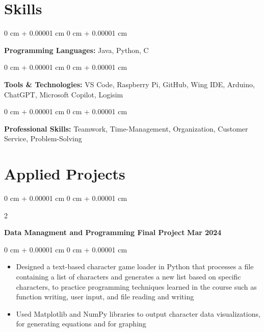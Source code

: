 \documentclass[10pt, letterpaper]{article}
\newenvironment{highlights}{
    \begin{itemize}[
        topsep=0.10 cm,
        parsep=0.10 cm,
        partopsep=0pt,
        itemsep=0pt,
        leftmargin=0 cm + 10pt
    ]
}{
    \end{itemize}
} %
\newenvironment{onecolentry}{
    \begin{adjustwidth}{
        0 cm + 0.00001 cm
    }{
        0 cm + 0.00001 cm
    }
}{
    \end{adjustwidth}
} %
\newenvironment{twocolentry}[2][]{
    \onecolentry
    \def\secondColumn{#2}
    \setcolumnwidth{\fill, 4.5 cm}
    \begin{paracol}{2}
}{
    \switchcolumn \raggedleft \secondColumn
    \end{paracol}
    \endonecolentry
} %
\begin{document}
    
    \section{Skills}

        \begin{onecolentry}
            \textbf{Programming Languages:} Java, Python, C
        \end{onecolentry}

        \vspace{0.2 cm}

        \begin{onecolentry}
            \textbf{Tools \& Technologies:} VS Code, Raspberry Pi, GitHub, Wing IDE, Arduino, ChatGPT, Microsoft Copilot, Logisim
        \end{onecolentry}

        \vspace{0.2 cm}
        
        \begin{onecolentry}
            \textbf{Professional  Skills:} Teamwork, Time-Management, Organization, Customer Service, Problem-Solving
        \end{onecolentry}

    \section{Applied Projects}



        
        \begin{twocolentry}{
            \textbf{Mar 2024}
        }
            \textbf{Data Managment and Programming Final Project}\end{twocolentry}

        \vspace{0.10 cm}
        \begin{onecolentry}
            \begin{highlights}
                \item Designed a text-based character game loader in Python that processes a file containing a list of characters and generates a new list based on specific characters, to practice programming techniques learned in the course such as function writing, user input, and file reading and writing
                \item Used Matplotlib and NumPy libraries to output character data visualizations, for generating equations and for graphing
            \end{highlights}
        \end{onecolentry}
\end{document}
